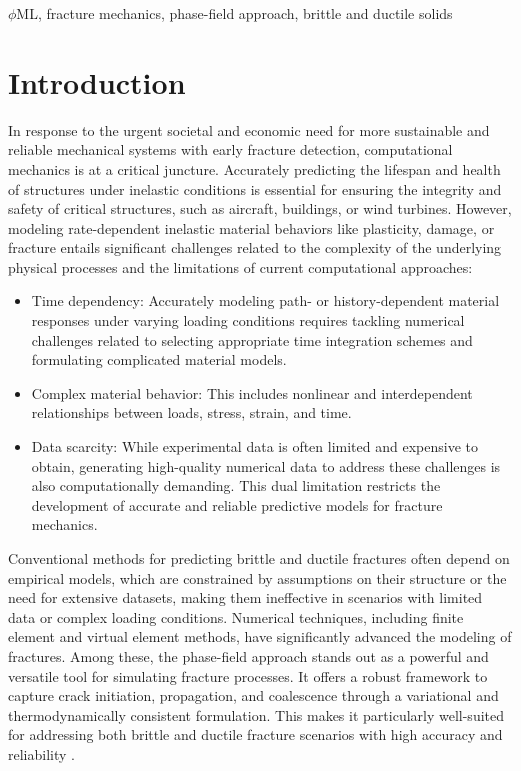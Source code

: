 \documentclass[final,3p,times]{elsarticle}
\begin{document}
\begin{frontmatter}
\begin{keyword}
$\phi$ML, fracture mechanics, phase-field approach, brittle and ductile solids
\end{keyword}

\end{frontmatter}


\section{Introduction}
\label{sec1}

 
In response to the urgent societal and economic need for more sustainable and reliable mechanical systems with early fracture detection, computational mechanics is at a critical juncture. Accurately predicting the lifespan and health of structures under inelastic conditions is essential for ensuring the integrity and safety of critical structures, such as aircraft, buildings, or wind turbines. However, modeling rate-dependent inelastic material behaviors like plasticity, damage, or fracture entails significant challenges related to the complexity of the underlying physical processes and the limitations of current computational approaches:
\begin{itemize}
\item Time dependency: Accurately modeling path- or history-dependent material responses under varying loading conditions requires tackling numerical challenges related to selecting appropriate time integration schemes and formulating complicated material models.
\item Complex material behavior: This includes nonlinear and interdependent relationships between loads, stress, strain, and time.
\item Data scarcity: While experimental data is often limited and expensive to obtain, generating high-quality numerical data to address these challenges is also computationally demanding. This dual limitation restricts the development of accurate and reliable predictive models for fracture mechanics.
\end{itemize}
Conventional methods for predicting brittle and ductile fractures often depend on empirical models, which are constrained by assumptions on their structure or the need for extensive datasets, making them ineffective in scenarios with limited data or complex loading conditions.
%
Numerical techniques, including finite element and virtual element methods, have significantly advanced the modeling of fractures. Among these, the phase-field approach stands out as a powerful and versatile tool for simulating fracture processes. It offers a robust framework to capture crack initiation, propagation, and coalescence through a variational and thermodynamically consistent formulation. This makes it particularly well-suited for addressing both brittle and ductile fracture scenarios with high accuracy and reliability \cite{golahmar2023phase,abubakar2022influence,noii2022probabilistic,carrara2020framework,seiler2020efficient,storm2021comparative,baktheer2024phase,noii2022bayesian,chen2020adaptive,heider2020phase, Heider2021_review_PFHyd}.
\end{document}
